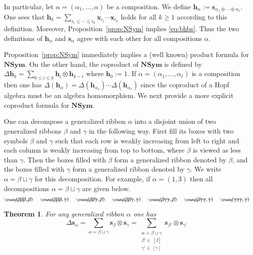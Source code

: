 \documentclass{amsart}
\newtheorem{theorem}{Theorem}[section]
\newtheorem*{Young's Rule}{Young's Rule}
\theoremstyle{definition}
\theoremstyle{remark}
\numberwithin{equation}{section}
\begin{document}
In particular, let $\alpha=(\alpha_1,\ldots,\alpha)$ be a composition. We define ${{\mathbf h}}_\alpha:={{\mathbf s}}_{\alpha_1\oplus\cdots\oplus\alpha_\ell}$. One sees that ${{\mathbf h}}_k=\sum_{i_1\leq\cdots\leq i_k}{{\mathbf x}}_{i_1}\cdots {{\mathbf x}}_{i_k}$ holds for all $k\ge1$ according to this definition. Moreover, Proposition~\ref{prop:NSym} implies \eqref{eq:bhbs}. Thus the two definitions of ${{\mathbf h}}_\alpha$ and ${{\mathbf s}}_\alpha$ agree with each other for all compositions $\alpha$.

Proposition~\ref{prop:NSym} immediately implies a (well known) product formula for ${\mathbf{NSym}}$. On the other hand, the coproduct of ${\mathbf{NSym}}$ is defined by $ \Delta{{\mathbf h}}_k=\sum_{0\le i\le k} {{\mathbf h}}_i\otimes{{\mathbf h}}_{k-i} $ where ${{\mathbf h}}_0:=1$. If $\alpha=(\alpha_1,\ldots,\alpha_\ell)$ is a composition then one has $\Delta({{\mathbf h}}_\alpha)=\Delta({{\mathbf h}}_{\alpha_1})\cdots\Delta({{\mathbf h}}_{\alpha_\ell})$ since the coproduct of a Hopf algebra must be an algebra homomorphism. We next provide a more explicit coproduct formula for ${\mathbf{NSym}}$.

One can decompose a generalized ribbon $\alpha$ into a disjoint union of two generalized ribbons $\beta$ and $\gamma$ in the following way. First fill its boxes with two symbols $\beta$ and $\gamma$ such that each row is weakly increasing from left to right and each column is weakly increasing from top to bottom, where $\beta$ is viewed as less than $\gamma$. Then the boxes filled with $\beta$ form a generalized ribbon denoted by $\beta$, and the boxes filled with $\gamma$ form a generalized ribbon denoted by $\gamma$. We write $\alpha=\beta\sqcup \gamma$ for this decomposition. For example, if $\alpha=(1,3)$ then all decompositions $\alpha=\beta\sqcup\gamma$ are given below.
\[\scriptsize
\young(\beta\beta\beta,\beta)\qquad
\young(\beta\beta\beta,\gamma)\qquad
\young(\beta\beta\gamma,\beta)\qquad
\young(\beta\beta\gamma,\gamma)\qquad
\young(\beta\gamma\gamma,\beta)\qquad
\young(\beta\gamma\gamma,\gamma)\qquad
\young(\gamma\gamma\gamma,\gamma)
\]

\begin{theorem}\label{thm:CoprodSchur}
For any generalized ribbon $\alpha$ one has
\[ \Delta{{\mathbf s}}_\alpha = \sum_{\alpha=\beta\sqcup\gamma} {{\mathbf s}}_{\beta}\otimes{{\mathbf s}}_{\gamma} = \sum_{\substack{\alpha=\beta\sqcup\gamma \\ \beta'\in\,[\beta] \\ \gamma'\in\,[\gamma]}} {{\mathbf s}}_{\beta'}\otimes{{\mathbf s}}_{\gamma'}\]
\end{theorem}
\end{document}
